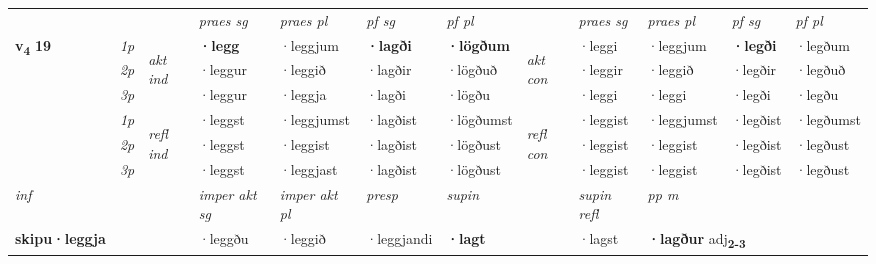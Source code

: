 \begin{longtable}[l]{X>{\footnotesize\itshape}llXXXXlXXXX}
 & &   & \textit{praes sg}  & \textit{praes pl}    & \textit{ pf sg} & \textit{pf pl} & & \textit{praes sg}  & \textit{praes pl}    & \textit{pf sg} & \textit{pf pl }  \\ \cmidrule{4-7} \cmidrule{9-12}
 \multirow{2}{*}{{{\textbf{v{\textsubscript{4}}} \Large{\textbf{19}}}}}  & 1p & \multirow{3}{*}{\begin{turn}{90}\textit{akt ind}\end{turn}} & \textbf{·legg} & ·leggjum & \textbf{·lagði} & \textbf{·lögðum} & \multirow{3}{*}{\begin{turn}{90}\textit{akt con}\end{turn}} &·leggi & ·leggjum & \textbf{·legði} & ·legðum\\*
 & 2p &  &  ·leggur  & ·leggið & ·lagðir & ·lögðuð & & ·leggir & ·leggið & ·legðir & ·legðuð \\*
 & 3p &  & ·leggur & ·leggja & ·lagði & ·lögðu & & ·leggi & ·leggi& ·legði & ·legðu \\*
\cmidrule{4-7} \cmidrule{9-12}
 & 1p & \multirow{3}{*}{\begin{turn}{90}\textit{refl ind}\end{turn}}  & ·leggst & ·leggjumst & ·lagðist & ·lögðumst & \multirow{3}{*}{\begin{turn}{90}\textit{refl con}\end{turn}}  &·leggist & ·leggjumst & ·legðist & ·legðumst \\*
 & 2p &  & ·leggst & ·leggist & ·lagðist & ·lögðust & &·leggist & ·leggist & ·legðist & ·legðust \\*
 & 3p  & & ·leggst & ·leggjast & ·lagðist & ·lögðust & & ·leggist & ·leggist& ·legðist & ·legðust \\*
\cmidrule{4-7} \cmidrule{9-12}

   {\textit{inf}} & &  & \textit{imper akt sg} & \textit{imper akt pl}   & \textit{presp} & \textit{supin} && \textit{supin refl} & \textit{pp m} \\*
  {\textbf{skipu\allowbreak ·leggja}} & && ·leggðu  & ·leggið   & ·leggjandi &  \textbf{·lagt} && ·lagst & \multicolumn{2}{l}{\textbf{·lagður} adj\textbf{\textsubscript{2-3}}} \\*

\midrule


\end{longtable}
